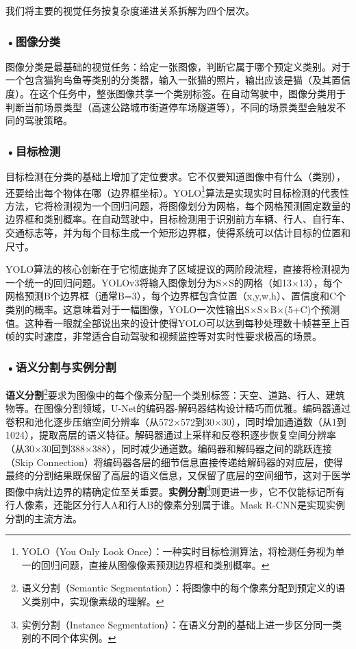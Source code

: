 我们将主要的视觉任务按复杂度递进关系拆解为四个层次。

\subsubsection*{\textbf{•图像分类}}

图像分类是最基础的视觉任务：给定一张图像，判断它属于哪个预定义类别。对于一个包含猫狗鸟鱼等类别的分类器，输入一张猫的照片，输出应该是猫（及其置信度）。在这个任务中，整张图像共享一个类别标签。在自动驾驶中，图像分类用于判断当前场景类型（高速公路城市街道停车场隧道等），不同的场景类型会触发不同的驾驶策略。

\subsubsection*{\textbf{•目标检测}}

目标检测在分类的基础上增加了定位要求。它不仅要知道图像中有什么（类别），还要给出每个物体在哪（边界框坐标）。YOLO\footnote{YOLO（You Only Look Once）：一种实时目标检测算法，将检测任务视为单一的回归问题，直接从图像像素预测边界框和类别概率。}算法是实现实时目标检测的代表性方法，它将检测视为一个回归问题，将图像划分为网格，每个网格预测固定数量的边界框和类别概率。在自动驾驶中，目标检测用于识别前方车辆、行人、自行车、交通标志等，并为每个目标生成一个矩形边界框，使得系统可以估计目标的位置和尺寸。

YOLO算法的核心创新在于它彻底抛弃了区域提议的两阶段流程，直接将检测视为一个统一的回归问题。YOLOv3将输入图像划分为S$\times$S的网格（如13$\times$13），每个网格预测B个边界框（通常B=3），每个边界框包含位置（x,y,w,h）、置信度和C个类别的概率。这意味着对于一幅图像，YOLO一次性输出S$\times$S$\times$B$\times$(5+C)个预测值。这种看一眼就全部说出来的设计使得YOLO可以达到每秒处理数十帧甚至上百帧的实时速度，非常适合自动驾驶和视频监控等对实时性要求极高的场景。

\subsubsection*{\textbf{•语义分割与实例分割}}

\textbf{语义分割}\footnote{语义分割（Semantic Segmentation）：将图像中的每个像素分配到预定义的语义类别中，实现像素级的理解。}要求为图像中的每个像素分配一个类别标签：天空、道路、行人、建筑物等。在图像分割领域，U-Net的编码器-解码器结构设计精巧而优雅。编码器通过卷积和池化逐步压缩空间分辨率（从572$\times$572到30$\times$30），同时增加通道数（从1到1024），提取高层的语义特征。解码器通过上采样和反卷积逐步恢复空间分辨率（从30$\times$30回到388$\times$388），同时减少通道数。编码器和解码器之间的跳跃连接（Skip Connection）将编码器各层的细节信息直接传递给解码器的对应层，使得最终的分割结果既保留了高层的语义信息，又保留了底层的空间细节，这对于医学图像中病灶边界的精确定位至关重要。\textbf{实例分割}\footnote{实例分割（Instance Segmentation）：在语义分割的基础上进一步区分同一类别的不同个体实例。}则更进一步，它不仅能标记所有行人像素，还能区分行人A和行人B的像素分别属于谁。Mask R-CNN是实现实例分割的主流方法。

